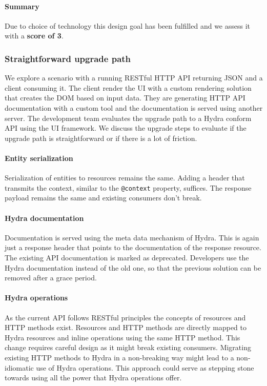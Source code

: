 \paragraph{Summary}
Due to choice of technology this design goal has been fulfilled and we assess it with a \textbf{score of 3}.

\subsubsection{Straightforward upgrade path}
We explore a scenario with a running RESTful HTTP API returning JSON and a client consuming it. The client render the UI with a custom rendering solution that creates the DOM based on input data. They are generating HTTP API documentation with a custom tool and the documentation is served using another server. The development team evaluates the upgrade path to a Hydra conform API using the UI framework. We discuss the upgrade steps to evaluate if the upgrade path is straightforward or if there is a lot of friction.

\paragraph{Entity serialization}
Serialization of entities to resources remains the same. Adding a header that transmits the context, similar to the \lstinline{@context} property, suffices. The response payload remains the same and existing consumers don't break.

\paragraph{Hydra documentation}
Documentation is served using the meta data mechanism of Hydra. This is again just a response header that points to the documentation of the response resource. The existing API documentation is marked as deprecated. Developers use the Hydra documentation instead of the old one, so that the previous solution can be removed after a grace period.

\paragraph{Hydra operations}
As the current API follows RESTful principles the concepts of resources and HTTP methods exist. Resources and HTTP methods are directly mapped to Hydra resources and inline operations using the same HTTP method. This change requires careful design as it might break existing consumers. Migrating existing HTTP methods to Hydra in a non-breaking way might lead to a non-idiomatic use of Hydra operations. This approach could serve as stepping stone towards using all the power that Hydra operations offer.

